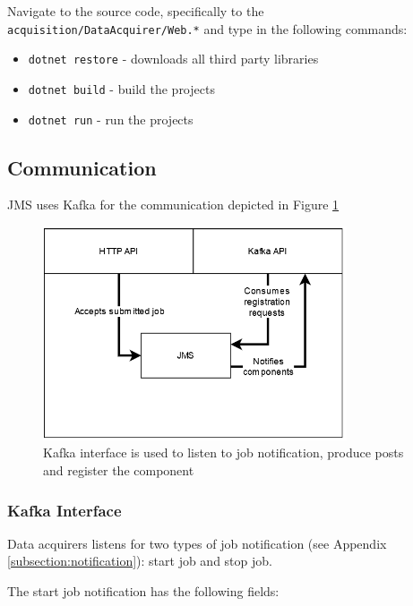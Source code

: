 Navigate to the source code, specifically to the \texttt{acquisition/DataAcquirer/Web.*} and type in the following commands:

\begin{itemize}
    \item \texttt{dotnet restore} - downloads all third party libraries
    \item \texttt{dotnet build} - build the projects
    \item \texttt{dotnet run} - run the projects
\end{itemize}

\subsection{Communication}\label{subsection:da_communication}

JMS uses Kafka for the communication depicted in Figure \ref{fig:apiDa}

\begin{figure}[H]
    \centering
    \includegraphics[width=0.8\textwidth]{diagrams/api-jms.png}
    \caption{Kafka interface is used to listen to job notification, produce posts and register the component}
    \label{fig:apiDa}
\end{figure}

\subsubsection{Kafka Interface}\label{subsubsection:da_kafkainterface}

Data acquirers listens for two types of job notification (see Appendix \ref{subsection:notification}): start job and stop job.

The start job notification has the following fields:


